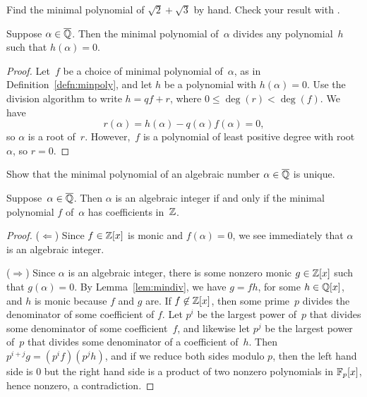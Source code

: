 \begin{exercise}
	Find the minimal polynomial of $\sqrt{2} + \sqrt{3}$ by hand. Check your result with \sage{}.
\end{exercise}

\begin{lemma}\label{lem:mindiv}
  Suppose $\alpha \in\overline{\mathbb{Q}}$.  Then the minimal polynomial of~$\alpha$
  divides any polynomial~$h$ such that $h(\alpha)=0$.
\end{lemma}
\begin{proof}
  Let~$f$ be a choice of minimal polynomial of~$\alpha$, as in
  Definition~\ref{defn:minpoly}, and let $h$ be a polynomial with
  $h(\alpha)=0$.  Use the division algorithm to write $h=qf + r$,
  where $0\leq \deg(r) < \deg(f)$.  We have $$r(\alpha) = h(\alpha) -
  q(\alpha) f(\alpha) = 0,$$ so $\alpha$ is a root of~$r$.
  However,~$f$ is a polynomial of least positive degree with
  root~$\alpha$, so $r=0$.
\end{proof}

\begin{exercise}
	Show that the minimal polynomial of an algebraic number $\alpha\in\overline{\mathbb{Q}}$ is unique. 
\end{exercise}

\begin{lemma}\label{lem:minpolint}
Suppose~$\alpha \in\overline{\mathbb{Q}}$. Then $\alpha$ is an algebraic integer if and only
if the minimal polynomial $f$ of~$\alpha$ has coefficients in~$\mathbb{Z}$.
\end{lemma}
\begin{proof}
($\Longleftarrow$) Since $f\in \mathbb{Z}[x]$ is monic and $f(\alpha)=0$, we see immediately
that $\alpha$ is an algebraic integer.

($\Longrightarrow$) Since $\alpha$ is an algebraic integer, there is
  some nonzero monic $g\in\mathbb{Z}[x]$ such that $g(\alpha)=0$.
  By Lemma~\ref{lem:mindiv}, we have $g=fh$, for some $h\in\mathbb{Q}[x]$, and
  $h$ is monic because $f$ and $g$ are.  If $f\not\in\mathbb{Z}[x]$, then some
  prime~$p$ divides the denominator of some coefficient of $f$.  Let
  $p^i$ be the largest power of~$p$ that divides some denominator of
  some coefficient~$f$, and likewise let $p^j$ be the largest power
  of~$p$ that divides some denominator of a coefficient of~$h$.  Then
  $p^{i+j}g = (p^if)(p^j h)$, and if we reduce both sides modulo $p$,
  then the left hand side is $0$ but the right hand side is a product
  of two nonzero polynomials in $\mathbb{F}_p[x]$, hence nonzero, a
  contradiction.
\end{proof}

